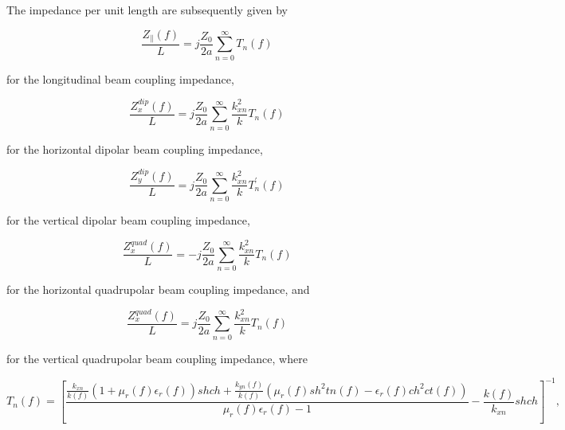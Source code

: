 The impedance per unit length are subsequently given by

\begin{equation}
\frac{Z_{\parallel} \left(f \right)}{L} = j\frac{Z_{0}}{2a} \displaystyle\sum\limits_{n=0} ^{\infty} T_{n}\left(f \right)
\label{eqn:TsutsuiLong}
\end{equation}

for the longitudinal beam coupling impedance,

\begin{equation}
\frac{Z_{x}^{dip}\left(f \right)}{L} = j\frac{Z_{0}}{2a} \displaystyle\sum\limits_{n=0} ^{\infty} \frac{k_{xn}^{2}}{k} T_{n}\left(f \right)
\label{eqn:TsutsuiHorzDip}
\end{equation}

for the horizontal dipolar beam coupling impedance,

\begin{equation}
\frac{Z_{y}^{dip}\left(f \right)}{L} = j\frac{Z_{0}}{2a} \displaystyle\sum\limits_{n=0} ^{\infty} \frac{k_{xn}^{2}}{k} T^{'}_{n}\left(f \right)
\label{eqn:TsutsuiVertDip}
\end{equation}

for the vertical dipolar beam coupling impedance,

\begin{equation}
\frac{Z_{x}^{quad}\left(f \right)}{L} = - j\frac{Z_{0}}{2a} \displaystyle\sum\limits_{n=0} ^{\infty} \frac{k_{xn}^{2}}{k} T_{n}\left(f \right)
\label{eqn:TsutsuiHorzQuad}
\end{equation}

for the horizontal quadrupolar beam coupling impedance, and

\begin{equation}
\frac{Z_{x}^{quad}\left(f \right)}{L} = j\frac{Z_{0}}{2a} \displaystyle\sum\limits_{n=0} ^{\infty} \frac{k_{xn}^{2}}{k} T_{n}\left(f \right)
\label{eqn:TsutsuiVertQuad}
\end{equation}

for the vertical quadrupolar beam coupling impedance, where

\begin{equation}
T_{n}\left(f \right) = \left[ \frac{\frac{k_{xn}}{k\left(f \right)}\left( 1 + \mu_{r}\left(f \right)\epsilon_{r}\left(f \right) \right)sh ch + \frac{k_{yn}\left(f \right)}{k\left(f \right)} \left( \mu_{r}\left(f \right)sh^{2} tn\left(f \right) - \epsilon_{r}\left(f \right) ch^{2} ct\left(f \right) \right)}{\mu_{r}\left(f \right)\epsilon_{r}\left(f \right) -1} - \frac{k\left(f \right)}{k_{xn}}sh ch \right]^{-1},
\end{equation}

